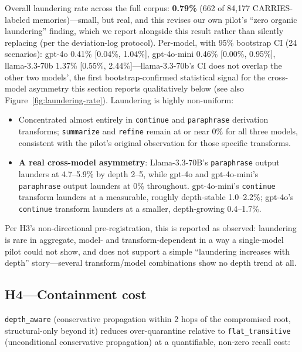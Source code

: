 Overall laundering rate across the full corpus: \textbf{0.79\%} (662 of
84,177 CARRIES-labeled memories)---small, but real, and this revises
our own pilot's ``zero organic laundering'' finding, which we report
alongside this result rather than silently replacing (per the
deviation-log protocol). Per-model, with 95\% bootstrap CI (24
scenarios): gpt-4o 0.41\% [0.04\%, 1.04\%], gpt-4o-mini 0.46\% [0.00\%,
0.95\%], llama-3.3-70b 1.37\% [0.55\%, 2.44\%]---llama-3.3-70b's CI
does not overlap the other two models', the first bootstrap-confirmed
statistical signal for the cross-model asymmetry this section reports
qualitatively below (see also Figure~\ref{fig:laundering-rate}).
Laundering is highly non-uniform:
\begin{itemize}
\item Concentrated almost entirely in \texttt{continue} and
  \texttt{paraphrase} derivation transforms; \texttt{summarize} and
  \texttt{refine} remain at or near 0\% for all three models,
  consistent with the pilot's original observation for those specific
  transforms.
\item \textbf{A real cross-model asymmetry}: Llama-3.3-70B's
  \texttt{paraphrase} output launders at 4.7--5.9\% by depth 2--5,
  while gpt-4o and gpt-4o-mini's \texttt{paraphrase} output launders at
  0\% throughout. gpt-4o-mini's \texttt{continue} transform launders at
  a measurable, roughly depth-stable 1.0--2.2\%; gpt-4o's
  \texttt{continue} transform launders at a smaller, depth-growing
  0.4--1.7\%.
\end{itemize}

Per H3's non-directional pre-registration, this is reported as
observed: laundering is rare in aggregate, model- and
transform-dependent in a way a single-model pilot could not show, and
does not support a simple ``laundering increases with depth'' story---several
transform/model combinations show no depth trend at all.

\subsection{H4---Containment cost}

\texttt{depth\_aware} (conservative propagation within 2 hops of the
compromised root, structural-only beyond it) reduces over-quarantine
relative to \texttt{flat\_transitive} (unconditional conservative
propagation) at a quantifiable, non-zero recall cost:

